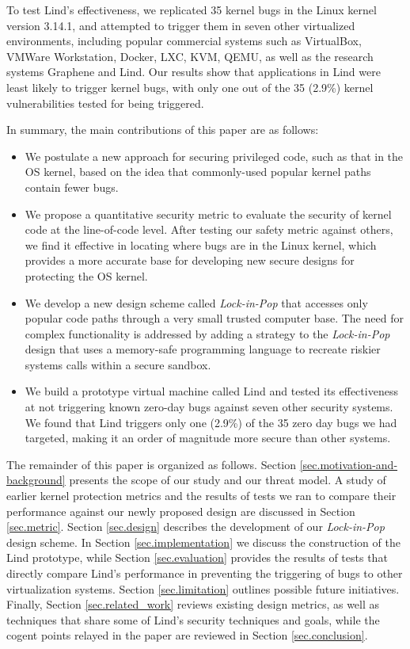 To test Lind's effectiveness, we replicated 35 kernel bugs in the Linux kernel version 3.14.1, 
and attempted to trigger them in seven other virtualized environments, 
including popular commercial systems such as VirtualBox, VMWare Workstation, 
Docker, LXC, KVM, QEMU, as well as the research systems Graphene and Lind. 
Our results show that applications in Lind were least likely to trigger kernel bugs, 
with only one out of the 35 (2.9\%) kernel vulnerabilities tested for being triggered.

In summary, the main contributions of this paper are as follows:

\begin{itemize}\setlength\itemsep{0em}
\item
We postulate a new approach for securing privileged code, 
such as that in the OS kernel, based on the idea that commonly-used popular kernel paths contain fewer bugs. 

\item
We propose a quantitative security metric to evaluate the security of kernel code at the line-of-code level. 
After testing our safety metric against others, we find it effective in locating where bugs are in the Linux kernel, 
which provides a more accurate base for developing new secure designs for protecting the OS kernel.

\item
We develop a new design scheme called \emph{Lock-in-Pop} that accesses only popular code paths 
through a very small trusted computer base. 
The need for complex functionality is addressed by adding a strategy to the \emph{Lock-in-Pop} design that 
uses a memory-safe programming language to recreate riskier systems calls within a secure sandbox. 

\item
We build a prototype virtual machine called Lind and tested its effectiveness at not triggering known zero-day bugs 
against seven other security systems. We found that Lind triggers only one (2.9\%) of the 35 zero day bugs we had targeted, 
making it an order of magnitude more secure than other systems.
\end{itemize}


The remainder of this paper is organized as follows.
Section \ref{sec.motivation-and-background} presents the scope of our study and our threat model. 
A study of earlier kernel protection metrics and the results of tests we ran to compare their performance 
against our newly proposed design are discussed in Section \ref{sec.metric}. 
Section \ref{sec.design} describes the development of our \emph{Lock-in-Pop} design scheme. 
In Section \ref{sec.implementation} we discuss the construction of the Lind prototype, 
while Section \ref{sec.evaluation} provides the  results of tests that directly compare Lind's performance 
in preventing the triggering of bugs to other virtualization systems. 
Section \ref{sec.limitation} outlines possible future initiatives. 
Finally, Section \ref{sec.related_work} reviews existing design metrics, as well as techniques that share some of Lind's security techniques and goals, 
while the cogent points relayed in the paper are reviewed in Section \ref{sec.conclusion}.